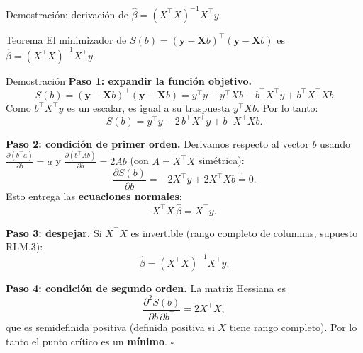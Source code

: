 \documentclass{beamer}
\begin{document}
\begin{frame}[allowframebreaks]{Demostración: derivación de $\hat{\beta}=(X^{\top}X)^{-1}X^{\top}y$}

\begin{alertblock}{Teorema}
El minimizador de $S(b)=(\mathbf{y}-\mathbf{X}b)^{\top}(\mathbf{y}-\mathbf{X}b)$ es $\hat{\beta}=(X^{\top}X)^{-1}X^{\top}y$.
\end{alertblock}

\begin{exampleblock}{Demostración}
\textbf{Paso 1: expandir la función objetivo.}
\[
S(b) = (\mathbf{y}-\mathbf{X}b)^{\top}(\mathbf{y}-\mathbf{X}b)
     = y^{\top}y - y^{\top}Xb - b^{\top}X^{\top}y + b^{\top}X^{\top}Xb
\]
Como $b^{\top}X^{\top}y$ es un escalar, es igual a su traspuesta $y^{\top}Xb$. Por lo tanto:
\[
S(b) = y^{\top}y - 2\,b^{\top}X^{\top}y + b^{\top}X^{\top}Xb.
\]

\framebreak

\textbf{Paso 2: condición de primer orden.} Derivamos respecto al vector $b$ usando
$\frac{\partial (b^{\top}a)}{\partial b}=a$ y $\frac{\partial (b^{\top}Ab)}{\partial b}=2Ab$ (con $A=X^{\top}X$ simétrica):
\[
\frac{\partial S(b)}{\partial b} = -2X^{\top}y + 2X^{\top}Xb \overset{!}{=} 0.
\]
Esto entrega las \textbf{ecuaciones normales}:
\[
X^{\top}X\,\hat{\beta} = X^{\top}y.
\]

\textbf{Paso 3: despejar.} Si $X^{\top}X$ es invertible (rango completo de columnas, supuesto RLM.3):
\[
\hat{\beta} = (X^{\top}X)^{-1}X^{\top}y.
\]

\framebreak

\textbf{Paso 4: condición de segundo orden.} La matriz Hessiana es
\[
\frac{\partial^2 S(b)}{\partial b\, \partial b^{\top}} = 2X^{\top}X,
\]
que es semidefinida positiva (definida positiva si $X$ tiene rango completo). Por lo tanto el punto crítico es un \textbf{mínimo}. \hfill $\square$
\end{exampleblock}

\end{frame}
\end{document}
